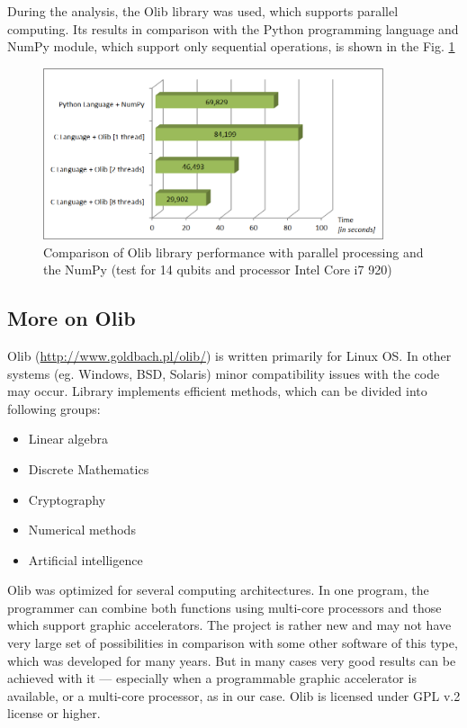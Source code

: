 \documentclass[10pt, a5paper]{article}
\begin{document}
During the analysis, the Olib library was used, which supports parallel computing. Its results in comparison with the Python programming language and NumPy module, which support only sequential operations, is shown in the Fig. \ref{fig:lf6}

\begin{figure}
  \centering
  \includegraphics[width=10cm]{18_2012_6.png}
\caption{Comparison of Olib library performance with parallel processing and the NumPy (test for 14 qubits and processor Intel Core i7 920)}
\label{fig:lf6}
\end{figure}

\subsection*{More on Olib}

Olib (\url{http://www.goldbach.pl/olib/}) is written primarily for Linux OS. In other systems (eg. Windows, BSD, Solaris) minor compatibility issues with the code may occur. Library implements efficient methods, which can be divided into following groups:

\begin{itemize}
  \item Linear algebra
  \item Discrete Mathematics
  \item Cryptography
  \item Numerical methods
  \item Artificial intelligence
\end{itemize}

Olib was optimized for several computing architectures. In one program, the programmer can combine both functions using multi-core processors and those which support graphic accelerators. The project is rather new and may not have very large set of possibilities in comparison with some other software of this type, which was developed for many years. But in many cases very good results can be achieved with it --- especially when a programmable graphic accelerator is available, or a multi-core processor, as in our case. Olib is licensed under GPL v.2 license or higher.
\end{document}
